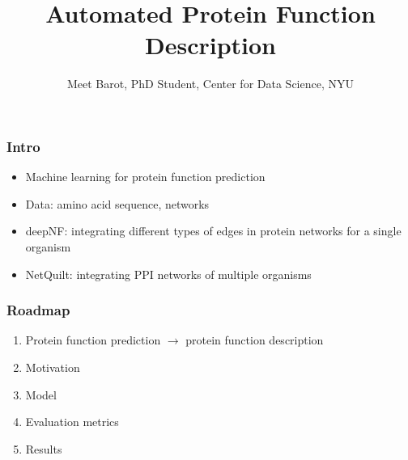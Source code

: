 \documentclass{beamer}
\title{Automated Protein Function Description}
\author{Meet Barot, PhD Student, Center for Data Science, NYU}
\begin{document}
\maketitle

\begin{frame}
    \frametitle{Intro}
    \begin{itemize}
        \item Machine learning for protein function prediction\pause
        \item Data: amino acid sequence, networks\pause
        \item deepNF: integrating different types of edges in protein networks for a single organism\pause
        \item NetQuilt: integrating PPI networks of multiple organisms
    \end{itemize}
\end{frame}

\begin{frame}
\frametitle{Roadmap}
\begin{enumerate}
    \item Protein function prediction $\rightarrow$ protein function description
    \item Motivation
    \item Model
    \item Evaluation metrics
    \item Results
\end{enumerate}
\end{frame}
\end{document}
